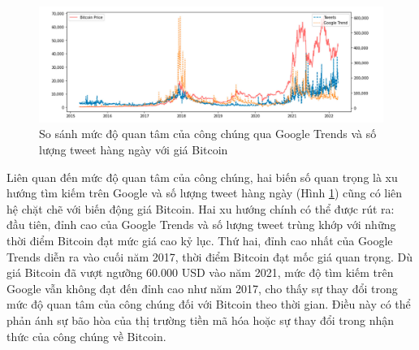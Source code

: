 \begin{figure}[h]
    \centering
    \includegraphics[width=\textwidth]{images/google_tweets_comparison.png}
    \caption{So sánh mức độ quan tâm của công chúng qua Google Trends và số lượng tweet hàng ngày với giá Bitcoin}
    \label{fig:interest_public}
\end{figure}

Liên quan đến mức độ quan tâm của công chúng, hai biến số quan trọng là xu hướng tìm kiếm trên Google và số lượng tweet hàng ngày (Hình \ref{fig:interest_public}) cũng có liên hệ chặt chẽ với biến động giá Bitcoin. Hai xu hướng chính có thể được rút ra: đầu tiên, đỉnh cao của Google Trends và số lượng tweet trùng khớp với những thời điểm Bitcoin đạt mức giá cao kỷ lục. Thứ hai, đỉnh cao nhất của Google Trends diễn ra vào cuối năm 2017, thời điểm Bitcoin đạt mốc giá quan trọng. Dù giá Bitcoin đã vượt ngưỡng 60.000 USD vào năm 2021, mức độ tìm kiếm trên Google vẫn không đạt đến đỉnh cao như năm 2017, cho thấy sự thay đổi trong mức độ quan tâm của công chúng đối với Bitcoin theo thời gian. Điều này có thể phản ánh sự bão hòa của thị trường tiền mã hóa hoặc sự thay đổi trong nhận thức của công chúng về Bitcoin.

